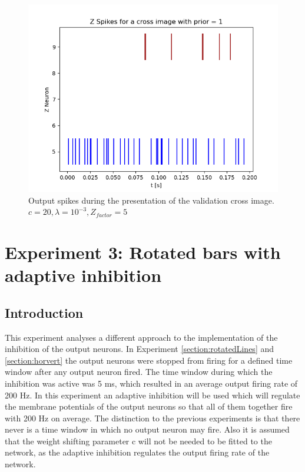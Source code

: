 \begin{figure}
  \includegraphics[width=\linewidth]{figures/horvert/horvert_c20_3_Zfactor5_crossZSpikes.png}
  \caption{Output spikes during the presentation of the validation cross image. $c = 20, \lambda = 10^{-3}, Z_{factor} = 5$}
  \label{fig:horvert_c20_3_Zfactor5_crossZSpikes}
\end{figure}



\section{Experiment 3: Rotated bars with adaptive inhibition}
\label{section:rotatedLinesAdaptiveInhibition}

\subsection{Introduction}

This experiment analyses a different approach to the implementation of the inhibition of the output neurons. 
In Experiment \ref{section:rotatedLines} and \ref{section:horvert} the output neurons were stopped from firing for a defined time window after any output neuron fired. The time window during which the inhibition was active was 5 ms, which resulted in an average output firing rate of 200 Hz. In this experiment an adaptive inhibition will be used which will regulate the membrane potentials of the output neurons so that all of them together fire with 200 Hz on average. The distinction to the previous experiments is that there never is a time window in which no output neuron may fire. Also it is assumed that the weight shifting parameter c will not be needed to be fitted to the network, as the adaptive inhibition regulates the output firing rate of the network.

